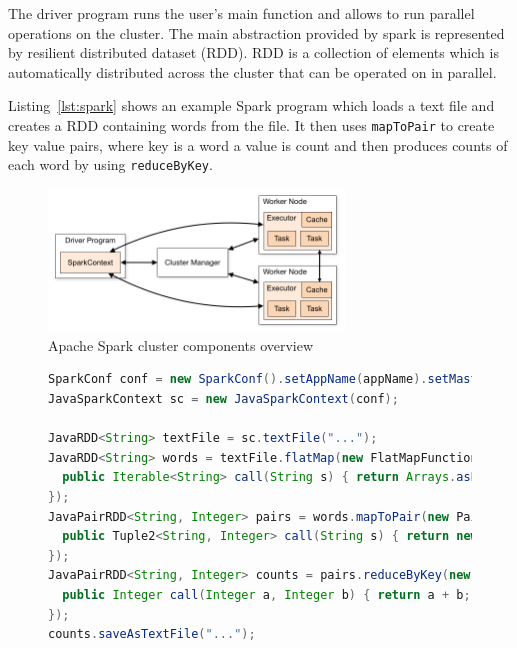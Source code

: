 \documentclass{l4proj}
\begin{document}
The driver program runs the user's main function and allows to run parallel operations on the cluster.
The main abstraction provided by spark is represented by resilient distributed dataset (RDD). RDD is
a collection of elements which is automatically distributed across the cluster that can be operated on
in parallel.

Listing~\ref{lst:spark} shows an example Spark program which loads a text file and creates a RDD
containing words from the file. It then uses \texttt{mapToPair} to create key value pairs, where 
key is a word a value is count and then produces counts of each word by using \texttt{reduceByKey}.

\begin{figure}
\centering
\includegraphics[width=0.7\textwidth]{images/spark.png}
\caption{Apache Spark cluster components overview \protect\footnotemark}
\label{fig:spark}
\end{figure}

\begin{figure}
  \begin{lstlisting}[language=Java]
SparkConf conf = new SparkConf().setAppName(appName).setMaster(master);
JavaSparkContext sc = new JavaSparkContext(conf);

JavaRDD<String> textFile = sc.textFile("...");
JavaRDD<String> words = textFile.flatMap(new FlatMapFunction<String, String>() {
  public Iterable<String> call(String s) { return Arrays.asList(s.split(" ")); }
});
JavaPairRDD<String, Integer> pairs = words.mapToPair(new PairFunction<String, String, Integer>() {
  public Tuple2<String, Integer> call(String s) { return new Tuple2<String, Integer>(s, 1); }
});
JavaPairRDD<String, Integer> counts = pairs.reduceByKey(new Function2<Integer, Integer, Integer>() {
  public Integer call(Integer a, Integer b) { return a + b; }
});
counts.saveAsTextFile("...");
  \end{lstlisting}
\end{figure}
\end{document}
